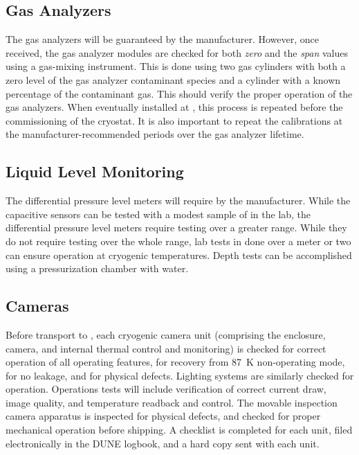 \subsection{Gas Analyzers}
\label{sec:fdgen-slow-cryo-qc-ga}

The gas analyzers will be guaranteed by the manufacturer. However, once received, the gas analyzer modules are checked for both \textit{zero} and the \textit{span} values using a gas-mixing instrument. This is done using two gas cylinders with both a zero level of the gas analyzer contaminant species and a cylinder with a known percentage of the contaminant gas. This should verify the proper operation of the gas analyzers. When eventually installed at \surf, this process is repeated before the commissioning of the cryostat. It is also important to repeat the calibrations at the manufacturer-recommended periods over the gas analyzer lifetime.


\subsection{Liquid Level Monitoring}
\label{sec:fdgen-slow-cryo-qc-llm}

The differential pressure level meters will require  by the manufacturer.
While the capacitive %
sensors can be tested with a modest sample of \lar in the lab,
the differential pressure level meters require testing over a greater range.  While they do not
require testing over the whole range,  lab tests  in \lar 
done over a meter or two can ensure operation
at cryogenic temperatures.  Depth tests can be accomplished using a
pressurization chamber with water.


\subsection{Cameras}
\label{sec:fdgen-slow-cryo-qc-c}

Before transport to \surf, each cryogenic camera unit (comprising the enclosure, camera, and internal thermal control and monitoring) is checked for correct operation of all operating features, for recovery from \SI{87}{K} non-operating mode, for no leakage, and for physical defects. Lighting systems are similarly checked for operation. Operations tests will include verification of correct current draw, image quality, and temperature readback and control. The movable inspection camera apparatus is inspected for physical defects, and checked for proper mechanical operation before shipping. A checklist is completed for each unit, filed electronically in the DUNE logbook, and a hard copy sent with each unit. 

